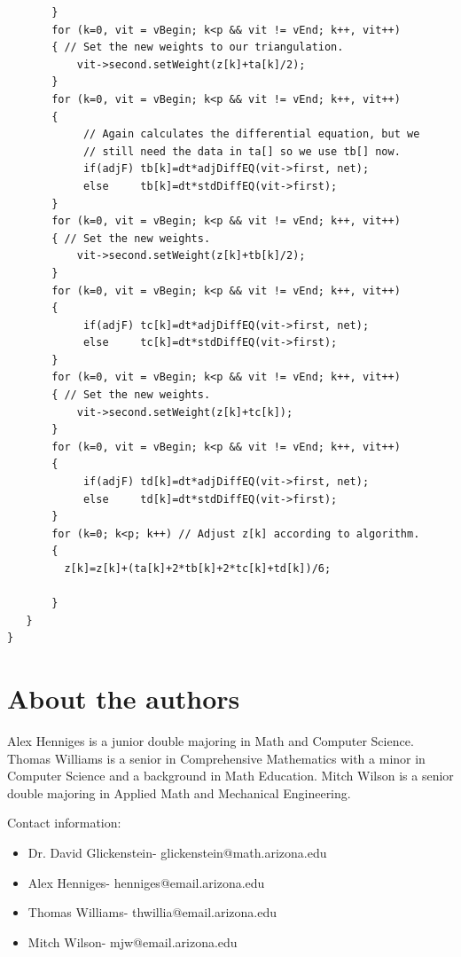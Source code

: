 \documentclass[12pt]{article}
\begin{document}
\begin{verbatim}
       }
       for (k=0, vit = vBegin; k<p && vit != vEnd; k++, vit++)  
       { // Set the new weights to our triangulation.
           vit->second.setWeight(z[k]+ta[k]/2);
       }
       for (k=0, vit = vBegin; k<p && vit != vEnd; k++, vit++)  
       {
            // Again calculates the differential equation, but we
            // still need the data in ta[] so we use tb[] now.
            if(adjF) tb[k]=dt*adjDiffEQ(vit->first, net);
            else     tb[k]=dt*stdDiffEQ(vit->first);
       }
       for (k=0, vit = vBegin; k<p && vit != vEnd; k++, vit++)  
       { // Set the new weights.
           vit->second.setWeight(z[k]+tb[k]/2);
       }
       for (k=0, vit = vBegin; k<p && vit != vEnd; k++, vit++)  
       {
            if(adjF) tc[k]=dt*adjDiffEQ(vit->first, net);
            else     tc[k]=dt*stdDiffEQ(vit->first);
       }
       for (k=0, vit = vBegin; k<p && vit != vEnd; k++, vit++)  
       { // Set the new weights.
           vit->second.setWeight(z[k]+tc[k]);
       }
       for (k=0, vit = vBegin; k<p && vit != vEnd; k++, vit++)  
       {
            if(adjF) td[k]=dt*adjDiffEQ(vit->first, net);
            else     td[k]=dt*stdDiffEQ(vit->first);
       }
       for (k=0; k<p; k++) // Adjust z[k] according to algorithm.
       {
         z[k]=z[k]+(ta[k]+2*tb[k]+2*tc[k]+td[k])/6;
         
       }
   }
}
\end{verbatim}

\section*{About the authors}

Alex Henniges is a junior double majoring in Math and Computer Science. Thomas Williams is a senior in Comprehensive Mathematics with a minor in Computer Science and a background in Math Education. Mitch Wilson is a senior double majoring in Applied Math and Mechanical Engineering.\newline

\noindent Contact information:
\begin{itemize}
\item Dr. David Glickenstein- glickenstein@math.arizona.edu
\item Alex Henniges- henniges@email.arizona.edu
\item Thomas Williams- thwillia@email.arizona.edu
\item Mitch Wilson- mjw@email.arizona.edu
\end{itemize}
\end{document}
